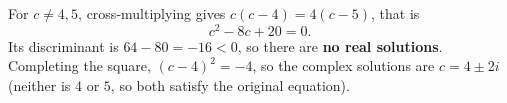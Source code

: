 For $c\ne4,5$, cross-multiplying gives $c(c-4)=4(c-5)$, that is
\[
c^2-8c+20=0 .
\]
Its discriminant is $64-80=-16<0$, so there are \textbf{no real solutions}. Completing the square, $(c-4)^2=-4$, so the complex solutions are $\boxed{c=4\pm2i}$ (neither is $4$ or $5$, so both satisfy the original equation).
